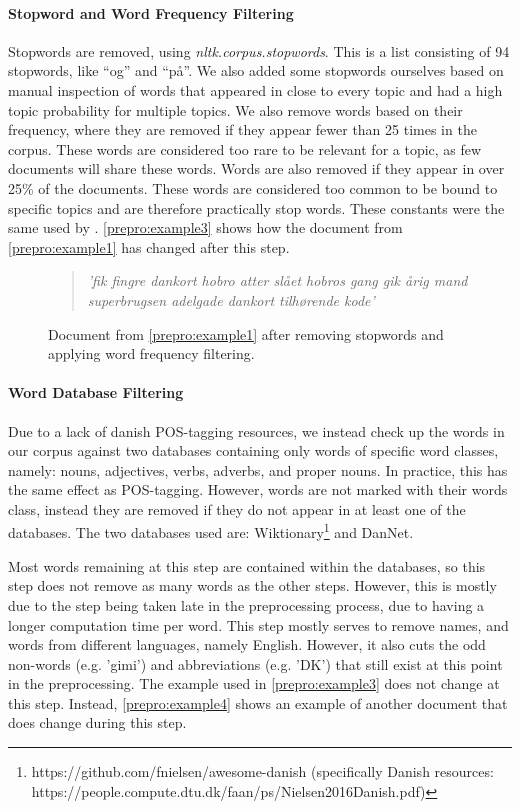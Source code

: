 \paragraph{Stopword and Word Frequency Filtering}
Stopwords are removed, using \emph{nltk.corpus.stopwords}. 
This is a list consisting of 94 stopwords, like ``og'' and ``på''.
We also added some stopwords ourselves based on manual inspection of words that appeared in close to every topic and had a high topic probability for multiple topics.
We also remove words based on their frequency, where they are removed if they appear fewer than 25 times in the corpus.
These words are considered too rare to be relevant for a topic, as few documents will share these words.
Words are also removed if they appear in over 25\% of the documents.
These words are considered too common to be bound to specific topics and are therefore practically stop words.
These constants were the same used by \cite{quanti}.
\autoref{prepro:example3} shows how the document from \autoref{prepro:example1} has changed after this step.
\begin{figure}[h]
	\begin{framed}
		\begin{quote}
			\textit{
				'fik fingre dankort hobro atter slået hobros gang gik årig mand superbrugsen adelgade dankort tilhørende kode'
			}
		\end{quote}
	\end{framed}
	\caption{Document from \autoref{prepro:example1} after removing stopwords and applying word frequency filtering.}
	\label{prepro:example3}
\end{figure}


\paragraph{Word Database Filtering}
Due to a lack of danish POS-tagging resources, we instead check up the words in our corpus against two databases containing only words of specific word classes, namely: nouns, adjectives, verbs, adverbs, and proper nouns.
In practice, this has the same effect as POS-tagging.
However, words are not marked with their words class, instead they are removed if they do not appear in at least one of the databases.
The two databases used are:  Wiktionary\footnote{https://github.com/fnielsen/awesome-danish (specifically Danish resources: https://people.compute.dtu.dk/faan/ps/Nielsen2016Danish.pdf)} and DanNet\cite{Pedersen2009DanNetTC}. 

Most words remaining at this step are contained within the databases, so this step does not remove as many words as the other steps.
However, this is mostly due to the step being taken late in the preprocessing process, due to having a longer computation time per word.
This step mostly serves to remove names, and words from different languages, namely English.
However, it also cuts the odd non-words (e.g. 'gimi') and abbreviations (e.g. 'DK') that still exist at this point in the preprocessing.
The example used in \autoref{prepro:example3} does not change at this step. 
Instead, \autoref{prepro:example4} shows an example of another document that does change during this step.

